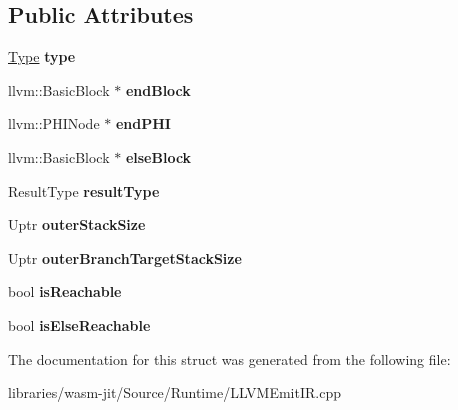 \subsection*{Public Attributes}
\begin{DoxyCompactItemize}
\item 
\mbox{\label{struct_l_l_v_m_j_i_t_1_1_emit_function_context_1_1_control_context_a12fb3970bc296a8292ebc94867c0cd0e}} 
\mbox{\hyperlink{struct_type}{Type}} {\bfseries type}
\item 
\mbox{\label{struct_l_l_v_m_j_i_t_1_1_emit_function_context_1_1_control_context_a941e539cc4eb4163f2843f4c83798e8e}} 
llvm\+::\+Basic\+Block $\ast$ {\bfseries end\+Block}
\item 
\mbox{\label{struct_l_l_v_m_j_i_t_1_1_emit_function_context_1_1_control_context_a6ebd8c45902a9580cc1cea0b4191c3af}} 
llvm\+::\+P\+H\+I\+Node $\ast$ {\bfseries end\+P\+HI}
\item 
\mbox{\label{struct_l_l_v_m_j_i_t_1_1_emit_function_context_1_1_control_context_ad38f070ec671dd4619a6d7294144a0bb}} 
llvm\+::\+Basic\+Block $\ast$ {\bfseries else\+Block}
\item 
\mbox{\label{struct_l_l_v_m_j_i_t_1_1_emit_function_context_1_1_control_context_a2296b625f78bba41076a622393985152}} 
Result\+Type {\bfseries result\+Type}
\item 
\mbox{\label{struct_l_l_v_m_j_i_t_1_1_emit_function_context_1_1_control_context_a816f3da1f72127b14974c730ef4ef0c7}} 
Uptr {\bfseries outer\+Stack\+Size}
\item 
\mbox{\label{struct_l_l_v_m_j_i_t_1_1_emit_function_context_1_1_control_context_ae381226eecef903637e065697388e6ab}} 
Uptr {\bfseries outer\+Branch\+Target\+Stack\+Size}
\item 
\mbox{\label{struct_l_l_v_m_j_i_t_1_1_emit_function_context_1_1_control_context_a08ccf7bdf41b8c944c8be6625e7e0dce}} 
bool {\bfseries is\+Reachable}
\item 
\mbox{\label{struct_l_l_v_m_j_i_t_1_1_emit_function_context_1_1_control_context_acc1f7654f80ee24cb6b881414281c2c8}} 
bool {\bfseries is\+Else\+Reachable}
\end{DoxyCompactItemize}


The documentation for this struct was generated from the following file\+:\begin{DoxyCompactItemize}
\item 
libraries/wasm-\/jit/\+Source/\+Runtime/L\+L\+V\+M\+Emit\+I\+R.\+cpp\end{DoxyCompactItemize}
